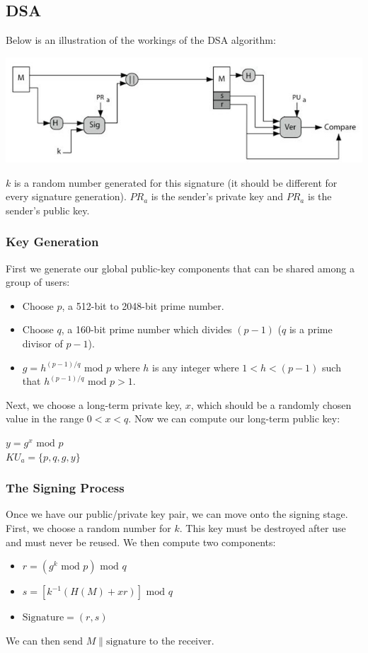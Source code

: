 \documentclass{article}
\newcommand{\Mod}[1]{\text{ mod }#1}
\begin{document}
\subsection{DSA}
Below is an illustration of the workings of the DSA algorithm:
\begin{center}
  \includegraphics[scale=0.6]{dsa.jpg}
\end{center}
$k$ is a random number generated for this signature (it should be different for every signature generation). $PR_{a}$ is the sender's private key and $PR_{a}$ is the sender's public key.

\subsubsection{Key Generation}
First we generate our global public-key components that can be shared among a group of users:
\begin{itemize}
  \item Choose $p$, a 512-bit to 2048-bit prime number.
  \item Choose $q$, a 160-bit prime number which divides $(p-1)$ ($q$ is a prime divisor of $p-1$).
  \item $g = h^{(p-1)/q} \Mod p$ where $h$ is any integer where $1 < h < (p-1)$ such that $h^{(p-1)/q} \Mod p > 1$.
\end{itemize}
Next, we choose a long-term private key, $x$, which should be a randomly chosen value in the range $0 < x < q$. Now we can compute our long-term public key:
\begin{center}
  $y = g^{x} \Mod p$ \\
  $KU_{a} = \{p, q, g, y\}$
\end{center}

\subsubsection{The Signing Process}
Once we have our public/private key pair, we can move onto the signing stage. First, we choose a random number for $k$. This key must be destroyed after use and must never be reused. We then compute two components:
\begin{itemize}
  \item $r = (g^{k} \Mod p) \Mod q$
  \item $s = [k^{-1}(H(M) + xr)] \Mod q$
  \item $\text{Signature} = (r, s)$
\end{itemize}
We can then send $M \| \text{signature}$ to the receiver.
\end{document}

